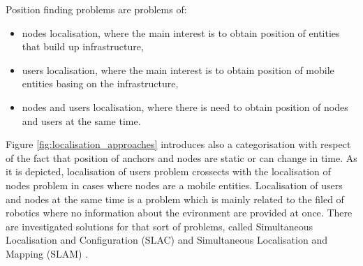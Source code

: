 \documentclass[../main.tex]{subfiles}
\begin{document}
Position finding problems are problems of:
\begin{itemize}
 	\item nodes localisation, where the main interest is to obtain position of entities that build up infrastructure,
 	\item users localisation, where the main interest is to obtain position of mobile entities basing on the infrastructure,
 	\item nodes and users localisation, where there is need to obtain position of nodes and users at the same time.
 \end{itemize}
Figure \ref{fig:localisation_approaches} introduces also a categorisation with respect of the fact that position of anchors and nodes are static or can change in time. As it is depicted, localisation of users problem crossects with the localisation of nodes problem in cases where nodes are a mobile entities. Localisation of users and nodes at the same time is a problem which is mainly related to the filed of robotics where no information about the evironment are provided at once. There are investigated solutions for that sort of problems, called Simultaneous Localisation and Configuration (SLAC) and Simultaneous Localisation and Mapping (SLAM) \cite{discover_beacons_and_position}.
\end{document}
